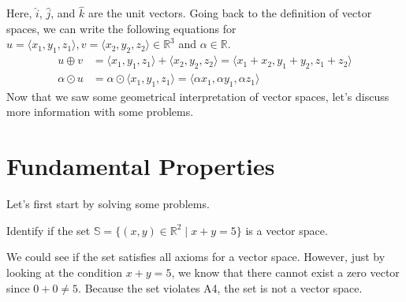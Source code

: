\documentclass[../main.tex]{subfiles}
\begin{document}
Here, $\hat{i}$, $\hat{j}$, and $\hat{k}$ are the unit vectors.
Going back to the definition of vector spaces, we can write the
following equations for $u = \langle x_1, y_1, z_1 \rangle,
v = \langle x_2, y_2, z_2 \rangle \in \mathbb{R}^3$ and $\alpha
\in \mathbb{R}$.
\begin{align*}
    u \oplus v
    &= \langle x_1, y_1, z_1 \rangle + \langle x_2, y_2, z_2 \rangle
    = \langle x_1 + x_2, y_1 + y_2, z_1 + z_2 \rangle \\
    \alpha \odot u
    &= \alpha \odot \langle x_1, y_1, z_1 \rangle
    = \langle \alpha x_1, \alpha y_1, \alpha z_1 \rangle
\end{align*}
Now that we saw some geometrical interpretation of vector spaces,
let's discuss more information with some problems.

\section{Fundamental Properties}

Let's first start by solving some problems.

\begin{problem}
Identify if the set $\mathbb{S} = \{ (x, y) \in \mathbb{R}^2 \mid
x + y = 5 \}$ is a vector space.
\end{problem}
\begin{solution}
We could see if the set satisfies all axioms for a vector space.
However, just by looking at the condition $x + y = 5$, we know that
there cannot exist a zero vector since $0 + 0 \neq 5$. Because the
set violates A4, the set is not a vector space.
\end{solution}
\end{document}
